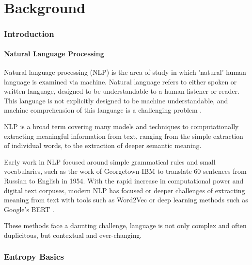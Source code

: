 \chapter{Background \label{ch:background}}

\subsection{Introduction}

\subsubsection{Natural Language Processing} 

Natural language processing (NLP) is the area of study in which 'natural' human language is examined via machine. Natural language refers to either spoken or written language, designed to be understandable to a human listener or reader. This language is not explicitly designed to be machine understandable, and machine comprehension of this language is a challenging problem .

NLP is a broad term covering many models and techniques to computationally extracting meaningful information from text, ranging from the simple extraction of individual words, to the extraction of deeper semantic meaning. 

Early work in NLP focused around simple grammatical rules and small vocabularies, such as the work of Georgetown-IBM  to translate 60 sentences from Russian to English in 1954. With the rapid increase in computational power and digital text corpuses, modern NLP has focused or deeper challenges of extracting meaning from text with tools such as Word2Vec  or deep learning methods such as Google's BERT .

These methods face a daunting challenge, language is not only complex and often duplicitous, but contextual and ever-changing. 



\subsection{Entropy Basics}

